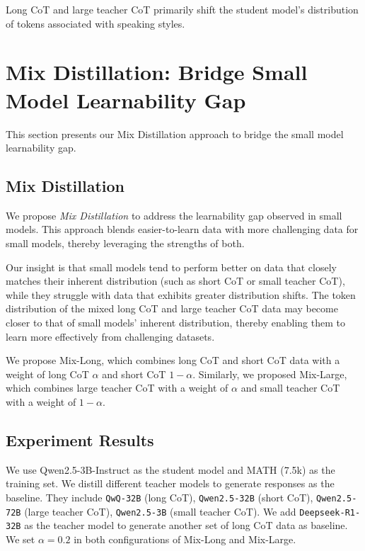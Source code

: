 \begin{AIbox}{} 
Long CoT and large teacher CoT primarily shift the student model's  distribution of tokens associated with speaking styles. 
\end{AIbox}




\section{Mix Distillation: Bridge Small Model Learnability Gap}
This section presents our Mix Distillation approach to bridge the small model learnability gap.
\subsection{Mix Distillation}
We propose \textit{Mix Distillation} to address the learnability gap observed in small models. This approach blends easier-to-learn data with more challenging data for small models, thereby leveraging the strengths of both. 

Our insight is that small models tend to perform better on data that closely matches their inherent distribution (such as short CoT or small teacher CoT), while they struggle with data that exhibits greater distribution shifts. The token distribution of the mixed long CoT and large teacher CoT data may become closer to that of small models' inherent distribution, thereby enabling them to learn more effectively from challenging datasets. 

We propose Mix-Long, which combines long CoT and short CoT data with a weight of long CoT $\alpha$ and short CoT $1-\alpha$. Similarly, we proposed Mix-Large, which combines large teacher CoT with a weight of $\alpha$ and small teacher CoT with a weight of $1-\alpha$.


\subsection{Experiment Results}

We use Qwen2.5-3B-Instruct as the student model and MATH (7.5k) as the training set. We distill different teacher models to generate responses as the baseline. They include \texttt{QwQ-32B} (long CoT), \texttt{Qwen2.5-32B} (short CoT), \texttt{Qwen2.5-72B} (large teacher CoT), \texttt{Qwen2.5-3B} (small teacher CoT). We add \texttt{Deepseek-R1-32B} \citep{DeepSeekAI2025DeepseekR1} as the teacher model to generate another set of long CoT data as baseline. We set $\alpha=0.2$ in both configurations of Mix-Long and Mix-Large.


